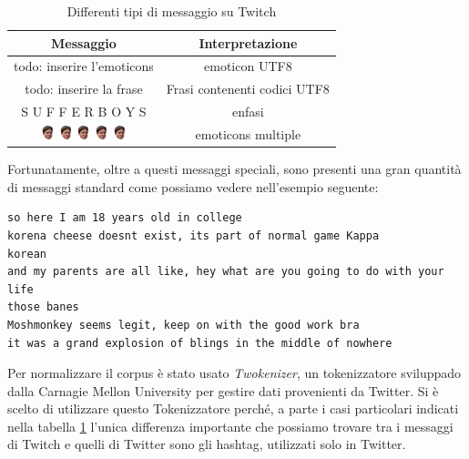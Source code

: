 \documentclass[a4paper,12pt,openright,twoside]{report}
\theoremstyle{definition}
\begin{document}
\begin{table}[h]
	\centering
	\begin{tabular}{|c|c|}
		\hline
		Messaggio & Interpretazione \\
		\hline
		\hline
		todo: inserire l'emoticons & emoticon UTF8 \\
		\hline
		todo: inserire la frase  & Frasi contenenti codici UTF8 \\
		\hline
		S U F F E R B O Y S & enfasi \\
		\hline
		\includegraphics[height=0.4cm, width=0.4cm]{Immagini/Emoticons/kappahd.png} \includegraphics[height=0.4cm, width=0.4cm]{Immagini/Emoticons/kappahd.png} \includegraphics[height=0.4cm, width=0.4cm]{Immagini/Emoticons/kappahd.png} \includegraphics[height=0.4cm, width=0.4cm]{Immagini/Emoticons/kappahd.png} \includegraphics[height=0.4cm, width=0.4cm]{Immagini/Emoticons/kappahd.png} & emoticons multiple \\
		\hline
	\end{tabular}
	\caption{Differenti tipi di messaggio su Twitch}
	\label{tab:messaggiTwitch}
\end{table}

Fortunatamente, oltre a questi messaggi speciali, 
sono presenti una gran quantità di messaggi standard come possiamo vedere nell'esempio seguente:

\begin{verbatim}
so here I am 18 years old in college
korena cheese doesnt exist, its part of normal game Kappa
korean
and my parents are all like, hey what are you going to do with your life
those banes
Moshmonkey seems legit, keep on with the good work bra
it was a grand explosion of blings in the middle of nowhere
\end{verbatim}

Per normalizzare il corpus è stato usato \emph{Twokenizer}, un tokenizzatore sviluppado dalla Carnagie Mellon University
per gestire dati provenienti da Twitter. 
Si è scelto di utilizzare questo Tokenizzatore perché, a parte i casi particolari indicati 
nella tabella
\ref{tab:messaggiTwitch} l'unica differenza importante che possiamo trovare tra i messaggi di Twitch e
quelli di Twitter sono gli
hashtag, utilizzati solo in Twitter. 
\end{document}
